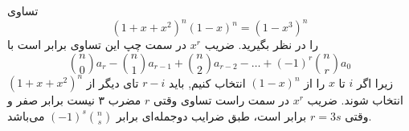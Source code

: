 \p
تساوی
$$(1 + x + x^2)^n(1 - x)^n = (1 - x^3)^n$$
 را در نظر بگیرید. ضریب $x^r$ در سمت چپ این تساوی برابر است با
$${n \choose 0}a_r - {n \choose 1}a_{r - 1} + {n \choose 2}a_{r - 2} - \dots + (-1)^r{n \choose r}a_0$$
زیرا اگر $i$ تا $x$
را از
$(1-x)^n$
انتخاب کنیم, باید $r-i$
تای دیگر از 
$(1+x+x^2)^n$
انتخاب شوند.
 ضریب
$x^r$ 
در سمت راست تساوی وقتی
$r$ مضرب ۳ نیست برابر صفر و وقتی
$r = 3s$ برابر
است، طبق ضرایب دوجمله‌ای برابر
$(-1)^s{n \choose s}$ می‌باشد.

